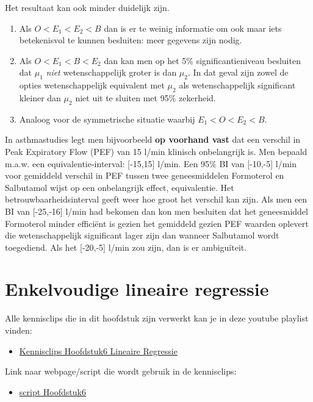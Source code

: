 \documentclass[
  12pt,dutch]{book}
\providecommand{\tightlist}{%
  \setlength{\itemsep}{0pt}\setlength{\parskip}{0pt}}
\theoremstyle{definition}
\theoremstyle{definition}
\theoremstyle{definition}
\theoremstyle{definition}
\theoremstyle{remark}
\begin{document}
Het resultaat kan ook minder duidelijk zijn.

\begin{enumerate}
\def\labelenumi{\arabic{enumi}.}
\tightlist
\item
  Als \(O < E_1 < E_2 < B\) dan is er te weinig informatie om ook maar iets betekenisvol te kunnen besluiten: meer gegevens zijn nodig.
\item
  Als \(O < E_1 < B < E_2\) dan kan men op het 5\% significantieniveau besluiten dat \(\mu_1\) \emph{niet} wetenschappelijk groter is dan \(\mu_2\). In dat geval zijn zowel de opties wetenschappelijk equivalent met \(\mu_2\) als wetenschappelijk significant kleiner dan \(\mu_2\) niet uit te sluiten met 95\% zekerheid.
\item
  Analoog voor de symmetrische situatie waarbij \(E_1 < O < E_2 < B.\)
\end{enumerate}

In asthmastudies legt men bijvoorbeeld \textbf{op voorhand vast} dat een verschil in Peak Expiratory Flow (PEF) van 15 l/min klinisch onbelangrijk is. Men bepaald m.a.w. een equivalentie-interval: {[}-15,15{]} l/min. Een 95\% BI van {[}-10,-5{]} l/min voor gemiddeld verschil in PEF tussen twee geneesmiddelen Formoterol en Salbutamol wijst op een onbelangrijk effect, equivalentie. Het betrouwbaarheidsinterval geeft weer hoe groot het verschil kan zijn.
Als men een BI van {[}-25,-16{]} l/min had bekomen dan kon men besluiten dat het geneesmiddel Formoterol minder efficiënt is gezien het gemiddeld gezien PEF waarden oplevert die wetenschappelijk significant lager zijn dan wanneer Salbutamol wordt toegediend. Als het {[}-20,-5{]} l/min zou zijn, dan is er ambiguïteit.

\chapter{Enkelvoudige lineaire regressie}\label{chap-linReg}

Alle kennisclips die in dit hoofdstuk zijn verwerkt kan je in deze youtube playlist vinden:

\begin{itemize}
\tightlist
\item
  \href{https://www.youtube.com/playlist?list=PLZH1hP8_LbJJyNBiMlv24sSI0oKB8EtI0}{Kennisclips Hoofdstuk6 Lineaire Regressie}
\end{itemize}

Link naar webpage/script die wordt gebruik in de kennisclips:

\begin{itemize}
\tightlist
\item
  \href{https://statomics.github.io/sbc/rmd/06-linearRegression.html}{script Hoofdstuk6}
\end{itemize}
\end{document}
